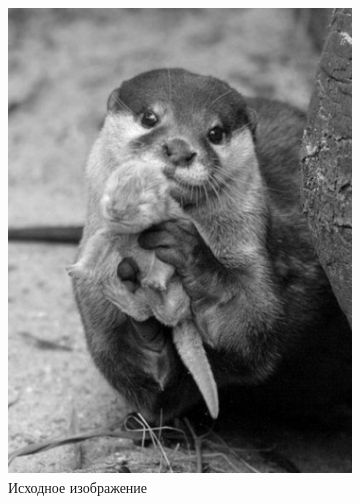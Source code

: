 \begin{figure}[ht!]
    \centering
    \begin{subfigure}[b]{0.5\linewidth}
        \centering
        \includegraphics[width=0.95\linewidth]{bw.png}
        \caption{Исходное изображение}
    \end{subfigure}%
    \begin{subfigure}[b]{0.5\linewidth}
        \centering

\end{subfigure}
\end{figure}
